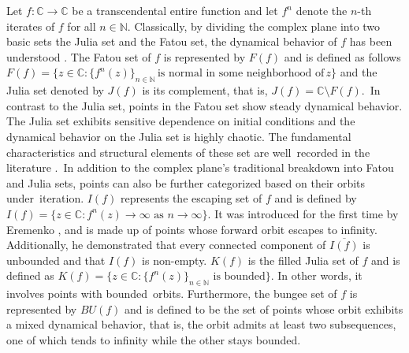 \documentclass[a4paper,12pt]{amsart}
\newcommand{\C}{\mathbb{C}}
\numberwithin{equation}{section}
\begin{document}
	
	
	Let $f:\C\to\mathbb{C}$ be a transcendental entire function and let
$f^{n}$ denote the $n$-th iterates of $f$ for all $n\in\mathbb{N}$. Classically, by dividing the complex plane into two basic sets the Julia set and the Fatou set, the dynamical behavior of $f$ has been understood \cite{baker1984wandering}. The Fatou set of $f$ is represented by $F(f)$ and is defined as follows $F(f)=\{z\in\mathbb{C} :\{f^{n}(z)\}_{n\in\mathbb{N}}\, \text{is normal in some neighborhood of} \, z\}$ and the Julia set denoted by $J(f)$ is its complement, that is, $J(f)=\mathbb{C}\setminus F(f)$. In contrast to the Julia set, points in the Fatou set show steady dynamical behavior. The Julia set exhibits sensitive dependence on initial conditions and the dynamical behavior on the Julia set is highly chaotic. The fundamental characteristics and structural elements of these set are well recorded in the literature \cite{bergweiler1993iteration}. In addition to the complex plane's traditional breakdown into Fatou and Julia sets,  points can also be further categorized based on their orbits under iteration. $I(f)$ represents the escaping set of $f$ and is defined by $I(f)=\{z\in\mathbb{C}: f^{n}(z)\to\infty \text{ as } n\to\infty\}$.
It was introduced for the first time by Eremenko \cite{eremenko1989iteration}, and is made up of points whose forward orbit escapes to infinity. Additionally, he demonstrated that every connected component of $\overline{I(f)}$ is unbounded and that $I(f)$ is non-empty. $K(f)$ is the filled Julia set of $f$ and is defined as $K(f)=\{z\in\mathbb{C}:\{f^{n}(z)\}_{n\in\mathbb{N}} \text{ is bounded}\}.$
In other words, it involves points with bounded orbits. Furthermore, the bungee set of $f$ is represented by $BU(f)$ and is defined to be the set of points whose orbit exhibits a mixed dynamical behavior, that is, the orbit admits at least two subsequences, one of which tends to infinity while the other stays bounded.
	
\end{document}
